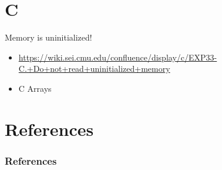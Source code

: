 \documentclass[10pt]{beamer}
\begin{document}
\section{C}
\frame{\sectionpage}
\begin{frame}{Memory is uninitialized!}
\begin{itemize}
 \item \href{https://wiki.sei.cmu.edu/confluence/display/c/EXP33-C.+Do+not+read+uninitialized+memory}{https://wiki.sei.cmu.edu/confluence/display/c/EXP33-C.+Do+not+read+uninitialized+memory}
 \item C Arrays
\end{itemize}

 
\end{frame}

\section{References}
    \begin{frame}[allowframebreaks]
      \frametitle{References}
      \begin{tiny}
      \nocite{*}
      \printbibliography
      \end{tiny}
    \end{frame}
\end{document}
